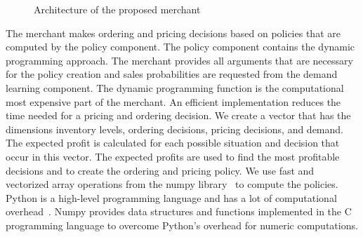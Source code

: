 \begin{figure}[t]
\centering
{}
\caption{Architecture of the proposed merchant}
\label{fig:merchant_architecture}
\end{figure}
\egroup

The merchant makes ordering and pricing decisions based on policies that are computed by the policy component.
The policy component contains the dynamic programming approach.
The merchant provides all arguments that are necessary for the policy creation and sales probabilities are requested from the demand learning component.
The dynamic programming function is the computational most expensive part of the merchant.
An efficient implementation reduces the time needed for a pricing and ordering decision.
We create a vector that has the dimensions inventory levels, ordering decisions, pricing decisions, and demand.
The expected profit is calculated for each possible situation and decision that occur in this vector.
The expected profits are used to find the most profitable decisions and to create the ordering and pricing policy.
We use fast and vectorized array operations from the numpy library~\cite{ascher2001numerical} to compute the policies.
Python is a high-level programming language and has a lot of computational overhead~\cite{DBLP:journals/cse/BehnelBCDSS11}.
Numpy provides data structures and functions implemented in the C programming language to overcome Python's overhead for numeric computations.

